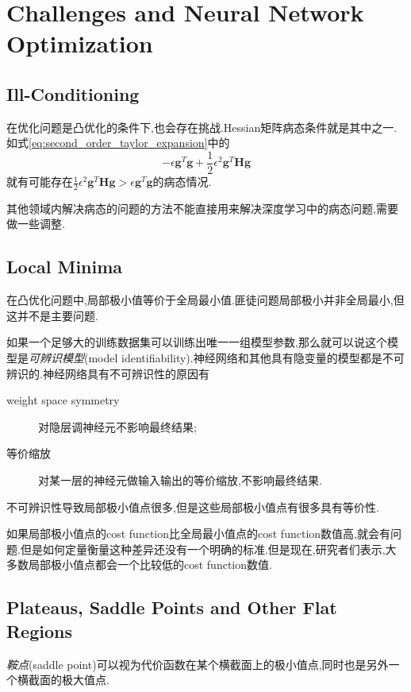 \section{Challenges and Neural Network Optimization}

\subsection{Ill-Conditioning}

在优化问题是凸优化的条件下,也会存在挑战.Hessian矩阵病态条件就是其中之一.如式\ref{eq:second_order_taylor_expansion}中的
\begin{equation}
-\epsilon\bm g^T\bm g+\frac{1}{2}\epsilon^2\bm g^T\bm{Hg}
\end{equation}
就有可能存在$\frac{1}{2}\epsilon^2\bm g^T\bm{Hg}>\epsilon\bm g^T\bm g$的病态情况.

其他领域内解决病态的问题的方法不能直接用来解决深度学习中的病态问题,需要做一些调整.

\subsection{Local Minima}

在凸优化问题中,局部极小值等价于全局最小值.匪徒问题局部极小并非全局最小,但这并不是主要问题.

如果一个足够大的训练数据集可以训练出唯一一组模型参数,那么就可以说这个模型是\textit{可辨识模型}(model identifiability).神经网络和其他具有隐变量的模型都是不可辨识的.神经网络具有不可辨识性的原因有
\begin{description}
    \item [weight space symmetry]对隐层调神经元不影响最终结果;
    \item [等价缩放]对某一层的神经元做输入输出的等价缩放,不影响最终结果.
\end{description}

不可辨识性导致局部极小值点很多,但是这些局部极小值点有很多具有等价性.

如果局部极小值点的cost function比全局最小值点的cost function数值高,就会有问题.但是如何定量衡量这种差异还没有一个明确的标准.但是现在,研究者们表示,大多数局部极小值点都会一个比较低的cost function数值.

\subsection{Plateaus, Saddle Points and Other Flat Regions}

\textit{鞍点}(saddle point)可以视为代价函数在某个横截面上的极小值点,同时也是另外一个横截面的极大值点.

